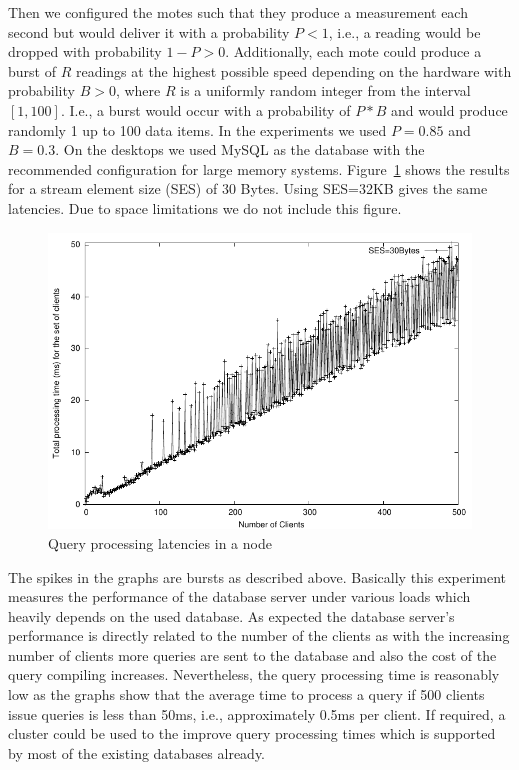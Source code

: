 Then we configured the motes such that they produce a measurement each second
but would deliver it with a probability $P<1$, i.e., a reading would be dropped
with probability $1-P>0$.  Additionally, each mote could produce a burst of $R$
readings at the highest possible speed depending on the hardware with
probability $B>0$, where $R$ is a uniformly random integer from the interval
$[1,100]$. I.e., a burst would occur with a probability of $P * B$ and would
produce randomly 1 up to 100 data items.  In the experiments we used $P=0.85$
and $B=0.3$. On the desktops we used MySQL as the database with the recommended
configuration for large memory systems.
Figure~\ref{fig:QueryProcessingLatency} shows the results for a stream element
size (SES) of 30 Bytes. Using SES=32KB gives the same latencies. Due
to space limitations we do not include this figure.

\begin{figure}%
  \centering
  \includegraphics[width=0.8\columnwidth]{ch-gsn-figures/query-processing-time-30bytes}
  \caption{Query processing latencies in a node}
  \label{fig:QueryProcessingLatency}
\end{figure}

The spikes in the graphs are bursts as described above. Basically this
experiment measures the performance of the database server under various loads
which heavily depends on the used database. As expected the database server's
performance is directly related to the number of the clients as with the
increasing number of clients more queries are sent to the database and also the
cost of the query compiling increases. Nevertheless, the query processing time
is reasonably low as the graphs show that the average time to process a query
if 500 clients issue queries is less than 50ms, i.e., approximately 0.5ms per
client. If required, a cluster could be used to the improve query processing
times which is supported by most of the existing databases already.

